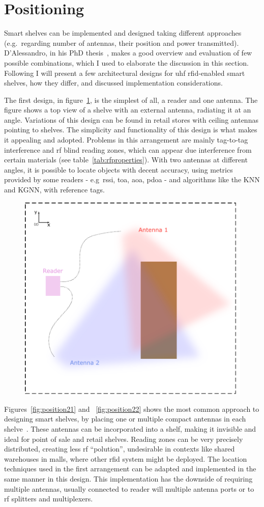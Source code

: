 \section{Positioning}

Smart shelves can be implemented and designed taking different approaches (e.g.\ regarding number of antennas, their position and power transmitted).
D’Alessandro, in his PhD thesis~\cite{dalessandroRFIDBasedSmartShelving2012}, makes a good overview and evaluation of few possible combinations, which I used to elaborate the discussion in this section.
Following I will present a few architectural designs for \ac{uhf} \ac{rfid}-enabled smart shelves, how they differ, and discussed implementation considerations.

The first design, in figure~\ref{fig:position1}, is the simplest of all, a reader and one antenna. The figure shows a top view of a shelve with an external antenna, radiating it at an angle. Variations of this design can be found in retail stores with ceiling antennas pointing to shelves.
The simplicity and functionality of this design is what makes it appealing and adopted.
Problems in this arrangement are mainly  tag-to-tag interference and \ac{rf} blind reading zones, which can appear due interference from certain materials (see table~\ref{tab:rfproperties}).
With two antennas at different angles, it is possible to locate objects with decent accuracy, using metrics provided by some readers - e.g\ \ac{rssi}, \ac{toa}, \ac{aoa}, \ac{pdoa} - and algorithms like the KNN and KGNN, with reference tags.

\begin{figure}[H]
    \centering
    \includegraphics[width=0.5\linewidth]{./figs/02-state-of-the-art/position1.pdf}
    \caption{} 
    \label{fig:position1}
\end{figure}

Figures~\ref{fig:position21} and ~\ref{fig:position22} shows the most common approach to designing smart shelves, by placing one or multiple compact antennas in each shelve~\cite{markakisSafeEfficientDesign2014}.
These antennas can be incorporated into a shelf, making it invisible and ideal for point of sale and retail shelves.
Reading zones can be very precisely distributed, creating less \ac{rf} ``polution'', undesirable in contexts like shared warehouses in malls, where other \ac{rfid} system might be deployed.
The location techniques used in the first arrangement can be adapted and implemented in the same manner in this design.
This implementation has the downside of requiring multiple antennas, usually connected to reader will multiple antenna ports or to \ac{rf} splitters and multiplexers.

